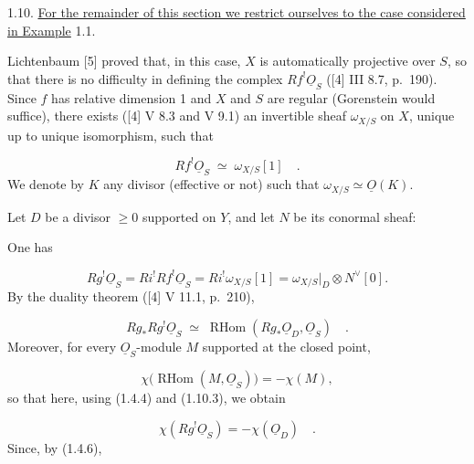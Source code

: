 
1.10. \underline{For the remainder of this section we restrict ourselves to the
case considered in Example} 1.1.

Lichtenbaum [5] proved that, in this case, $X$ is automatically projective over
$S$, so that there is no difficulty in defining the complex
$Rf^{!}\underline{O}_S$ ([4] III 8.7, p.~190).  Since $f$ has relative dimension
1 and $X$ and $S$ are regular (Gorenstein would suffice), there exists ([4] V 8.3
and V 9.1) an invertible sheaf $\omega_{X/S}$ on $X$, unique up to unique
isomorphism, such that

\begin{equation}\tag{1.10.1}
Rf^{!}\underline{O}_S \;\simeq\; \omega_{X/S}[1] \quad .
\end{equation}
We denote by $K$ any divisor (effective or not) such that
$\omega_{X/S}\simeq\underline{O}(K)$.

Let $D$ be a divisor $\geq0$ supported on $Y$, and let $N$ be its conormal sheaf:

\begin{center}
\end{center}
One has

\begin{equation}\tag{1.10.2}
Rg^{!}\underline{O}_S
=Ri^{!}Rf^{!}\underline{O}_S
=Ri^{!}\omega_{X/S}[1]
=\omega_{X/S}\big|_D\otimes N^{\vee}[0].
\end{equation}
By the duality theorem ([4] V 11.1, p.~210),

\begin{equation}\tag{1.10.3}
Rg_*Rg^{!}\underline{O}_S
\;\simeq\;
\operatorname{RHom}(Rg_*\underline{O}_D,\underline{O}_S) \quad .
\end{equation}
Moreover, for every $\underline{O}_S$-module $M$ supported at the closed point,

\begin{equation}\tag{1.10.4}
\chi\bigl(\operatorname{RHom}(M,\underline{O}_S)\bigr)=-\chi(M),
\end{equation}
so that here, using (1.4.4) and (1.10.3), we obtain

\begin{equation*}
\chi(Rg^{!}\underline{O}_S)=-\chi(\underline{O}_D) \quad .
\end{equation*}
Since, by (1.4.6),

